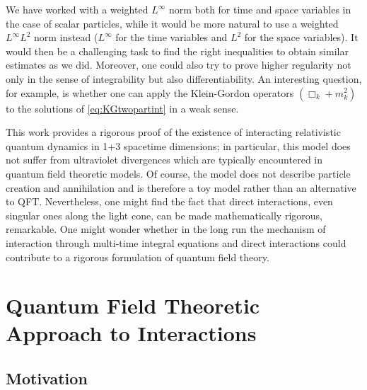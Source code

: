 \documentclass[b5paper,draft,openbib,12pt]{memoir}
\begin{document}
We have worked with a 
weighted $L^\infty$ norm both for time and space variables 
in the case of scalar particles, 
while it would be more natural 
to use a weighted $L^\infty L^2$ norm 
instead ($L^\infty$ for the time variables and $L^2$ for the 
space variables). It would then be a challenging task to 
find the right inequalities to obtain similar estimates as we 
did. Moreover, one could also try to prove higher regularity 
not only in the sense of integrability but also 
differentiability. An interesting question, for example, 
is whether one can apply the Klein-Gordon operators 
$(\Box_k + m_k^2)$ to the solutions of \eqref{eq:KGtwopartint} in 
a weak sense. 


This work provides a rigorous proof of the existence of 
interacting relativistic quantum dynamics in 1+3 spacetime 
dimensions; in particular, this model does not suffer from 
ultraviolet divergences which are typically encountered in 
quantum field theoretic models. Of course, the model does not 
describe particle creation and annihilation and is therefore a 
toy model rather than an alternative to QFT. Nevertheless, one 
might find the fact that direct interactions, even singular ones 
along the light cone, can be made mathematically rigorous, 
remarkable. One might wonder whether in the long 
run the mechanism of 
interaction through multi-time integral equations and direct 
interactions could contribute to a rigorous formulation of 
quantum field theory.










\chapter[Quantum Field Theoretic Approach to Interactions][Interaction in QFT]{Quantum Field Theoretic Approach to Interactions} \label{chap:QFT}

\section{Motivation}\label{sec: mot QED}
\end{document}
